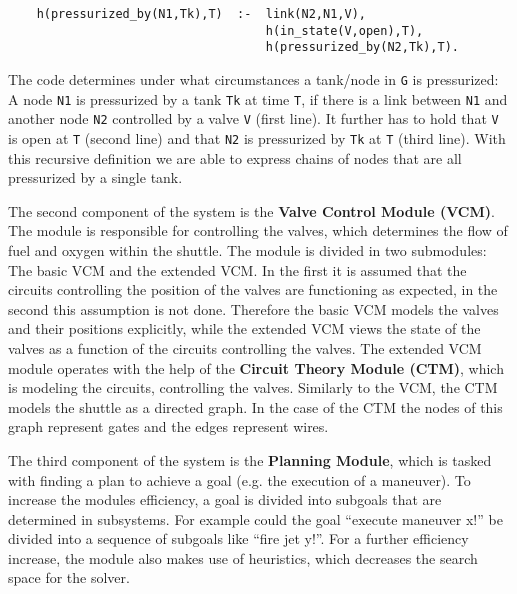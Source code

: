 \documentclass[runningheads]{llncs}
\begin{document}
\begin{verbatim}
    h(pressurized_by(N1,Tk),T)  :-  link(N2,N1,V),
                                    h(in_state(V,open),T),
                                    h(pressurized_by(N2,Tk),T).
\end{verbatim}
    
The code determines under what circumstances a tank/node in \verb|G| is pressurized: A node \verb|N1| is pressurized by a tank \verb|Tk| at time \verb|T|, if there is a link between \verb|N1| and another node \verb|N2| controlled by a valve \verb|V| (first line). It further has to hold that \verb|V| is open at \verb|T| (second line) and that \verb|N2| is pressurized by \verb|Tk| at \verb|T| (third line). With this recursive definition we are able to express chains of nodes that are all pressurized by a single tank. 

The second component of the system is the \textbf{Valve Control Module (VCM)}. The module is responsible for controlling the valves, which determines the flow of fuel and oxygen within the shuttle. The module is divided in two submodules: The basic VCM and the extended VCM. In the first it is assumed that the circuits controlling the position of the valves are functioning as expected, in the second this assumption is not done. Therefore the basic VCM models the valves and their positions explicitly, while the extended VCM views the state of the valves as a function of the circuits controlling the valves. The extended VCM module operates with the help of the \textbf{Circuit Theory Module (CTM)}, which is modeling the circuits, controlling the valves. Similarly to the VCM, the CTM models the shuttle as a directed graph. In the case of the CTM the nodes of this graph represent gates and the edges represent wires. 

The third component of the system is the \textbf{Planning Module}, which is tasked with finding a plan to achieve a goal (e.g. the execution of a maneuver). To increase the modules efficiency, a goal is divided into subgoals that are determined in subsystems. For example could the goal ``execute maneuver x!'' be divided into a sequence of subgoals like ``fire jet y!''. For a further efficiency increase, the module also makes use of heuristics, which decreases the search space for the solver. 
\end{document}
